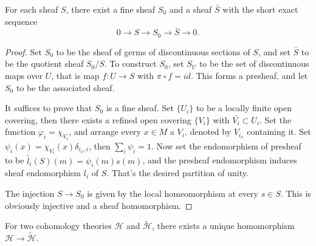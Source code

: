 \documentclass[twoside]{article}
\begin{document}
\begin{lemma}
  For each sheaf $S$, there exist a fine sheaf $S_0$ and a sheaf $\bar{S}$ with the short exact sequence$$
  0\to S\to S_0\to \bar{S}\to 0.
  $$
\end{lemma}
\begin{proof}
  Set $S_0$ to be  the sheaf of germs of discontinuous sections of $S$, and set $\bar{S}$ to  be the quotient sheaf $S_0/S$.  To construct $S_0$,   set  $S_U$ to be  the set of discontinuous maps over $U$, that is map $f\colon U\to S$ with $\pi\circ f=id$. This forms a presheaf, and let $S_0$ to be the associated sheaf.

  It suffices to prove that $S_0$ is a fine sheaf. Set $\{U_i\}$  to be a locally finite open covering, then there exists a refined open covering $\{V_i\}$ with $\bar{V_i}\subset U_i$. Set the function $\varphi_i=\chi_{V_i}$, and arrange every $x\in M$ a $V_i$, denoted by $V_{i_x}$  containing it. Set $\psi_i(x)=\chi_{V_i}(x)\delta_{i_x,i}$, then $\sum_i \psi_i=1$.  Now set the endomorphism of presheaf to be  $\tilde{l_i}(S)(m)=\psi_i(m)s(m)$, and the presheaf endomorphism induces sheaf endomorphism $l_i$ of $S$. That's the desired partition of unity.

  The injection $S\to S_0 $ is given by the local homeomorphism at every $s\in S$. This is obviously injective and a sheaf homomorphism.
\end{proof}




\begin{theorem}
  For two cohomology theories $\mathscr{H}$ and $\tilde{\mathscr{H}}$, there exists a unique homomorphism $\mathscr{H}\to \tilde{\mathscr{H}}$.
\end{theorem}
\end{document}

